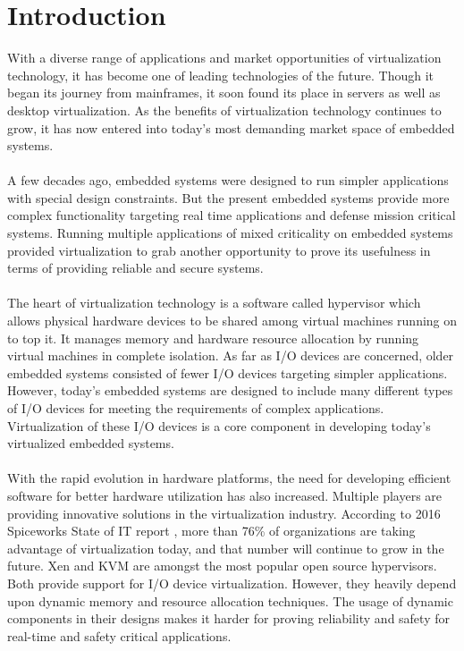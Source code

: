 \chapter{Introduction \label{cha:chapter1}}

With a diverse range of applications and market opportunities of virtualization technology, it has become one of leading technologies of the future. Though it began its journey from mainframes, it soon found its place in servers as well as desktop virtualization. As the benefits of virtualization technology continues to grow, it has now entered into today's most demanding market space of embedded systems.
\\
\\
A few decades ago, embedded systems were designed to run simpler applications with special design constraints. But the present embedded systems provide more complex functionality targeting real time applications and defense mission critical systems. Running multiple applications of mixed criticality on embedded systems provided virtualization to grab another opportunity to prove its usefulness in terms of providing reliable and secure systems. 
\\
\\
The heart of virtualization technology is a software called hypervisor which allows physical hardware devices to be shared among virtual machines running on to top it. It manages memory and hardware resource allocation by running virtual machines in complete isolation. As far as I/O devices are concerned, older embedded systems consisted of fewer I/O devices targeting simpler applications. However, today's embedded systems are designed to include many different types of I/O devices for meeting the requirements of complex applications. Virtualization of these I/O devices is a core component in developing today's virtualized embedded systems. 
\\
\\
With the rapid evolution in hardware platforms, the need for developing efficient software for better hardware utilization has also increased. Multiple players are providing innovative solutions in the virtualization industry. According to 2016 Spiceworks State of IT report \cite{spiceworks}, more than 76\% of organizations are taking advantage of virtualization today, and that number will continue to grow in the future. Xen and KVM are amongst the most popular open source hypervisors. Both provide support for I/O device virtualization. However, they heavily depend upon dynamic memory and resource allocation techniques. The usage of dynamic components in their designs makes it harder for proving reliability and safety for real-time and safety critical applications.
